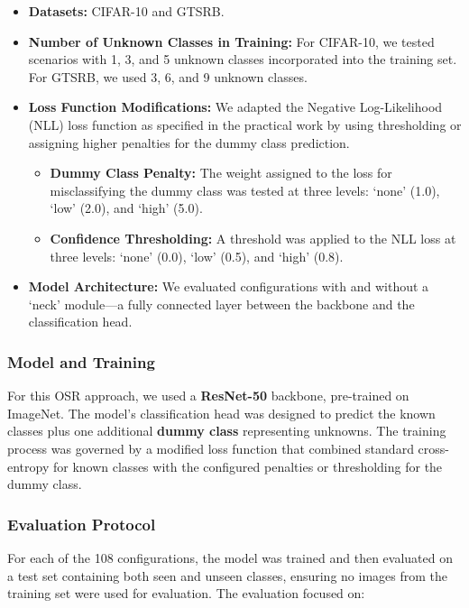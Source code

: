 \documentclass[11pt, a4paper]{article}
\begin{document}
\begin{itemize}
    \item \textbf{Datasets:} CIFAR-10 and GTSRB.
    \item \textbf{Number of Unknown Classes in Training:} For CIFAR-10, we tested scenarios with 1, 3, and 5 unknown classes incorporated into the training set. For GTSRB, we used 3, 6, and 9 unknown classes.
    \item \textbf{Loss Function Modifications:} We adapted the Negative Log-Likelihood (NLL) loss function as specified in the practical work by using thresholding or assigning higher penalties for the dummy class prediction.
    \begin{itemize}
        \item \textbf{Dummy Class Penalty:} The weight assigned to the loss for misclassifying the dummy class was tested at three levels: `none' (1.0), `low' (2.0), and `high' (5.0).
        \item \textbf{Confidence Thresholding:} A threshold was applied to the NLL loss at three levels: `none' (0.0), `low' (0.5), and `high' (0.8).
    \end{itemize}
    \item \textbf{Model Architecture:} We evaluated configurations with and without a `neck' module—a fully connected layer between the backbone and the classification head.
\end{itemize}

\subsubsection{Model and Training}
For this OSR approach, we used a \textbf{ResNet-50} backbone, pre-trained on ImageNet. The model's classification head was designed to predict the known classes plus one additional \textbf{dummy class} representing unknowns. The training process was governed by a modified loss function that combined standard cross-entropy for known classes with the configured penalties or thresholding for the dummy class.

\subsubsection{Evaluation Protocol}
For each of the 108 configurations, the model was trained and then evaluated on a test set containing both seen and unseen classes, ensuring no images from the training set were used for evaluation. The evaluation focused on:
\end{document}
